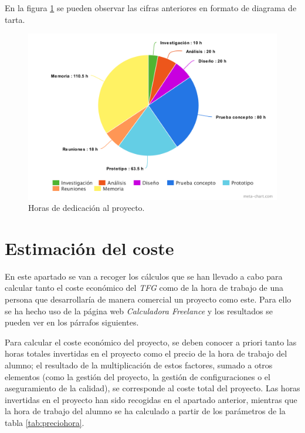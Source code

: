 En la figura \ref{fig:esfuerzos} se pueden observar las cifras anteriores en formato de diagrama de tarta. 

\begin{figure}[H]
    \centering
    \includegraphics[width=\textwidth,height=\textheight,keepaspectratio]{Imagenes/esfuerzos}
    \caption{Horas de dedicación al proyecto.}
    \label{fig:esfuerzos}
\end{figure}


\section{Estimación del coste} \label{gestion.estimacion}

En este apartado se van a recoger los cálculos que se han llevado a cabo para calcular tanto el coste económico del \textit{TFG} como de la hora de trabajo de una persona que desarrollaría de manera comercial un proyecto como este. Para ello se ha hecho uso de la página web \textit{Calculadora Freelance} \cite{calculadorafreelance} y los resultados se pueden ver en los párrafos siguientes. 
\par 
Para calcular el coste económico del proyecto, se deben conocer a priori tanto las horas totales invertidas en el proyecto como el precio de la hora de trabajo del alumno; el resultado de la multiplicación de estos factores, sumado a otros elementos (como la gestión del proyecto, la gestión de configuraciones o el aseguramiento de la calidad), se corresponde al coste total del proyecto. Las horas invertidas en el proyecto han sido recogidas en el apartado anterior, mientras que la hora de trabajo del alumno se ha calculado a partir de los parámetros de la tabla \ref{tab:preciohora}.


